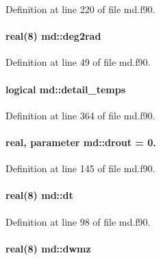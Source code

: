 Definition at line 220 of file md.\-f90.

\hypertarget{classmd_a74717183b234e02c3c62e961cbd09460}{
\paragraph[{deg2rad}]{\setlength{\rightskip}{0pt plus 5cm}real(8) md\-::deg2rad}}\label{classmd_a74717183b234e02c3c62e961cbd09460}


Definition at line 49 of file md.\-f90.

\hypertarget{classmd_a1c9d2008368707386240473477042fb0}{
\paragraph[{detail\-\_\-temps}]{\setlength{\rightskip}{0pt plus 5cm}logical md\-::detail\-\_\-temps}}\label{classmd_a1c9d2008368707386240473477042fb0}


Definition at line 364 of file md.\-f90.

\hypertarget{classmd_a2e56e27ddda05d3aba1f2b0e7642dc2b}{
\paragraph[{drout}]{\setlength{\rightskip}{0pt plus 5cm}real, parameter md\-::drout = 0.}}\label{classmd_a2e56e27ddda05d3aba1f2b0e7642dc2b}


Definition at line 145 of file md.\-f90.

\hypertarget{classmd_aeb13ba6424a8d9a774836510778185c2}{
\paragraph[{dt}]{\setlength{\rightskip}{0pt plus 5cm}real(8) md\-::dt}}\label{classmd_aeb13ba6424a8d9a774836510778185c2}


Definition at line 98 of file md.\-f90.

\hypertarget{classmd_a5b292ee2f5858a00b745d579c2562480}{
\paragraph[{dwmz}]{\setlength{\rightskip}{0pt plus 5cm}real(8) md\-::dwmz}}\label{classmd_a5b292ee2f5858a00b745d579c2562480}



